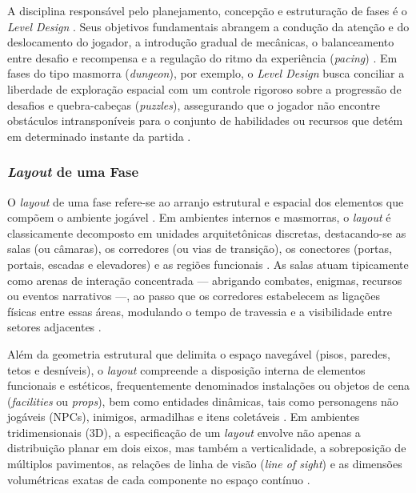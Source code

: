 A disciplina responsável pelo planejamento, concepção e estruturação de fases é o \textit{Level Design} \cite{dormans2010, tanagra}. Seus objetivos fundamentais abrangem a condução da atenção e do deslocamento do jogador, a introdução gradual de mecânicas, o balanceamento entre desafio e recompensa e a regulação do ritmo da experiência (\textit{pacing}) \cite{dormans2010, inproceedings, linden2014dungeons}. Em fases do tipo masmorra (\textit{dungeon}), por exemplo, o \textit{Level Design} busca conciliar a liberdade de exploração espacial com um controle rigoroso sobre a progressão de desafios e quebra-cabeças (\textit{puzzles}), assegurando que o jogador não encontre obstáculos intransponíveis para o conjunto de habilidades ou recursos que detém em determinado instante da partida \cite{linden2014dungeons, shaker2016constructive}.

\subsubsection{\textit{Layout} de uma Fase}
\label{sec:layout_fase}

O \textit{layout} de uma fase refere-se ao arranjo estrutural e espacial dos elementos que compõem o ambiente jogável \cite{dormans2010, linden2014dungeons}. Em ambientes internos e masmorras, o \textit{layout} é classicamente decomposto em unidades arquitetônicas discretas, destacando-se as salas (ou câmaras), os corredores (ou vias de transição), os conectores (portas, portais, escadas e elevadores) e as regiões funcionais \cite{linden2014dungeons, shaker2016constructive, xu2025databasedrivenframework3dlevel}. As salas atuam tipicamente como arenas de interação concentrada --- abrigando combates, enigmas, recursos ou eventos narrativos ---, ao passo que os corredores estabelecem as ligações físicas entre essas áreas, modulando o tempo de travessia e a visibilidade entre setores adjacentes \cite{inproceedings, shaker2016constructive}.

Além da geometria estrutural que delimita o espaço navegável (pisos, paredes, tetos e desníveis), o \textit{layout} compreende a disposição interna de elementos funcionais e estéticos, frequentemente denominados instalações ou objetos de cena (\textit{facilities} ou \textit{props}), bem como entidades dinâmicas, tais como personagens não jogáveis (NPCs), inimigos, armadilhas e itens coletáveis \cite{linden2014dungeons, xu2025constraint}. Em ambientes tridimensionais (3D), a especificação de um \textit{layout} envolve não apenas a distribuição planar em dois eixos, mas também a verticalidade, a sobreposição de múltiplos pavimentos, as relações de linha de visão (\textit{line of sight}) e as dimensões volumétricas exatas de cada componente no espaço contínuo \cite{xu2025constraint, xu2025databasedrivenframework3dlevel}.

